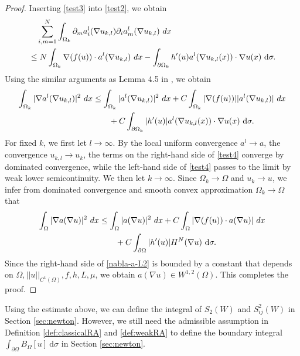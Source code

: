 \documentclass[10pt,a4paper]{amsart}
\numberwithin{equation}{section}
\newcommand{\pa}{\partial}
\newcommand{\dx}{\textup{d}x}
\begin{document}
\begin{proof}
    Inserting \eqref{test3} into \eqref{test2}, we obtain
    \begin{align*}
       &\quad  \sum\limits_{i,m=1}^N  \int_{\Omega_k}\pa_m a_i^l(\nabla u_{k,l}) \pa_i a_m^l(\nabla u_{k,l}) \ \dx \\
        & \leq N \int_{\Omega_k} \nabla (f(u)) \cdot a^l(\nabla u_{k,l})  \ \dx  - \int_{\pa \Omega_k} h'(u)a^l(\nabla u_{k,l}(x)) \cdot  \nabla u(x) \ \text{d} \sigma.
    \end{align*}
    Using the similar arguments as Lemma 4.5 in \cite{AKM2018}, we obtain
    \begin{align}\label{test4}
        \int_{\Omega_k} |\nabla a^l(\nabla u_{k,l}) |^2 \ \dx & \leq \int_{\Omega_k} |a^l(\nabla u_{k,l}) |^2 \ \dx +  C \int_{\Omega_k} |\nabla (f(u)) | | a^l(\nabla u_{k,l}) | \ \dx \\
        & \qquad + C  \int_{\pa \Omega_k}| h'(u)|a^l(\nabla u_{k,l}(x)) \cdot  \nabla u(x) \ \text{d} \sigma. \nonumber 
    \end{align}
    For fixed $k$, we first let $l\to\infty$. By the local uniform convergence $a^l\to a$, the convergence $u_{k,l}\to u_k$, the terms on the right-hand side of \eqref{test4} converge by dominated convergence, while the left-hand side of \eqref{test4} passes to the limit by weak lower semicontinuity. We then let $k\to\infty$. Since $\Omega_k \to\Omega$ and $u_k\to u$, we infer from dominated convergence and smooth convex approximation $\Omega_k\to\Omega$ that
    \begin{align}\label{nabla-a-L2}
        \int_{\Omega} |\nabla a(\nabla u) |^2 \ \dx & \leq \int_{\Omega} |a(\nabla u) |^2 \ \dx +  C \int_{\Omega} |\nabla (f(u)) \cdot a(\nabla u)|  \ \dx \\
        & \qquad + C  \int_{\pa \Omega} |h'(u)|H^N(\nabla u) \ \text{d} \sigma.\nonumber %
    \end{align}
    Since the right-hand side of \eqref{nabla-a-L2} is bounded by a constant that depends on $\Omega, ||u||_{C^1(\Omega)}, f,h, L, \mu$, we obtain $a(\nabla u) \in W^{1,2}(\Omega)$. This completes the proof.
\end{proof}


Using the estimate above, we can define the integral of $S_2(W)$ and $S_{ij}^2(W)$ in Section \ref{sec:newton}. However, we still need the admissible assumption in Definition \ref{def:classicalRA} and \ref{def:weakRA} to define the boundary integral $\int_{\pa \Omega} B_{\Omega}[u] \ \text{d} \sigma$ in Section \ref{sec:newton}. %
\end{document}
